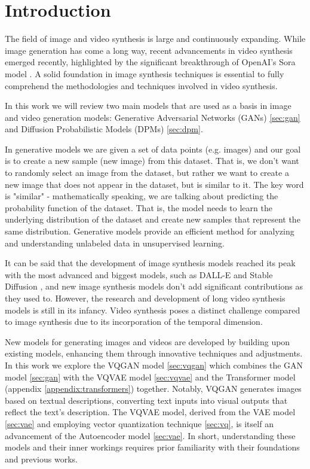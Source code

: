 \section{Introduction}

The field of image and video synthesis is large and continuously expanding. While image generation has come a long way, recent advancements in video synthesis emerged recently, highlighted by the significant breakthrough of OpenAI's Sora model \cite{sora_website}. A solid foundation in image synthesis techniques is essential to fully comprehend the methodologies and techniques involved in video synthesis.

In this work we will review two main models that are used as a basis in image and video generation models: Generative Adversarial Networks (GANs) \cite{gan} \ref{sec:gan} and Diffusion Probabilistic Models (DPMs) \cite{diffusion_models} \cite{ddpm} \ref{sec:dpm}.

In generative models we are given a set of data points (e.g. images) and our goal is to create a new sample (new image) from this dataset. That is, we don't want to randomly select an image from the dataset, but rather we want to create a new image that does not appear in the dataset, but is similar to it. The key word is "similar" - mathematically speaking, we are talking about predicting the probability function of the dataset. That is, the model needs to learn the underlying distribution of the dataset and create new samples that represent the same distribution. Generative models provide an efficient method for analyzing and understanding unlabeled data in unsupervised learning.

It can be said that the development of image synthesis models reached its peak with the most advanced and biggest models, such as DALL-E \cite{dalle} and Stable Diffusion \cite{stable_diffusion}, and new image synthesis models don't add significant contributions as they used to. However, the research and development of long video synthesis models is still in its infancy. Video synthesis poses a distinct challenge compared to image synthesis due to its incorporation of the temporal dimension.

New models for generating images and videos are developed by building upon existing models, enhancing them through innovative techniques and adjustments. In this work we explore the VQGAN model \cite{vqgan} \ref{sec:vqgan} which combines the GAN model \cite{gan} \ref{sec:gan} with the VQVAE model \cite{vqvae} \ref{sec:vqvae} and the Transformer model \cite{transformer} (appendix \ref{appendix:transformers}) together. Notably, VQGAN generates images based on textual descriptions, converting text inputs into visual outputs that reflect the text's description. The VQVAE model, derived from the VAE model \cite{vae} \ref{sec:vae} and employing vector quantization technique \cite{vqvae} \ref{sec:vq}, is itself an advancement of the Autoencoder model \cite{autoencoder} \ref{sec:vae}. In short, understanding these models and their inner workings requires prior familiarity with their foundations and previous works.

